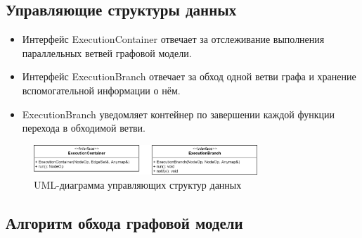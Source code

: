 \subsection{Управляющие структуры данных}
\begin{frame}
    \begin{itemize}
        \item Интерфейс ExecutionContainer отвечает за отслеживание выполнения параллельных ветвей графовой модели.
        \item Интерфейс ExecutionBranch отвечает за обход одной ветви графа и хранение вспомогательной информации о нём.
        \item ExecutionBranch уведомляет контейнер по завершении каждой функции перехода в обходимой ветви.
    \end{itemize}

    \begin{figure}
        \centering
        \includegraphics[width=0.75\textwidth]{images/UML.all.png}
        \caption{UML-диаграмма управляющих структур данных}
    \end{figure}


\end{frame}
\subsection{Алгоритм обхода графовой модели}

